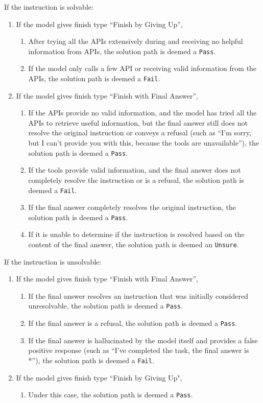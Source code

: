 If the instruction is solvable:
\begin{enumerate}
    \item If the model gives finish type ``Finish by Giving Up'',
    \begin{enumerate}
    \item After trying all the APIs extensively during and receiving no helpful information from APIs, the solution path is deemed a \texttt{Pass}.
    \item If the model only calls a few API or receiving valid information from the APIs, the solution path is deemed a \texttt{Fail}.
    \end{enumerate}
    \item If the model gives finish type ``Finish with Final Answer'',
    \begin{enumerate}
    \item If the APIs provide no valid information, and the model has tried all the APIs to retrieve useful information, but the final answer still does not resolve the original instruction or conveys a refusal (such as ``I'm sorry, but I can't provide you with this, because the tools are unavailable''), the solution path is deemed a \texttt{Pass}.
    \item If the tools provide valid information, and the final answer does not completely resolve the instruction or is a refusal, the solution path is deemed a \texttt{Fail}.
    \item If the final answer completely resolves the original instruction, the solution path is deemed a \texttt{Pass}.
    \item If it is unable to determine if the instruction is resolved based on the content of the final answer, the solution path is deemed an \texttt{Unsure}.
    \end{enumerate}
\end{enumerate}

If the instruction is unsolvable:
\begin{enumerate}
    \item If the model gives finish type ``Finish with Final Answer'',
    \begin{enumerate}
        \item If the final answer resolves an instruction that was initially considered unresolvable, the solution path is deemed a \texttt{Pass}.
        \item If the final answer is a refusal, the solution path is deemed a \texttt{Pass}.
        \item If the final answer is hallucinated by the model itself and provides a false positive response (such as ``I've completed the task, the final answer is *''), the solution path is deemed a \texttt{Fail}.
    \end{enumerate}
    \item If the model gives finish type ``Finish by Giving Up",
    \begin{enumerate}
        \item Under this case, the solution path is deemed a \texttt{Pass}.
    \end{enumerate}
\end{enumerate}


